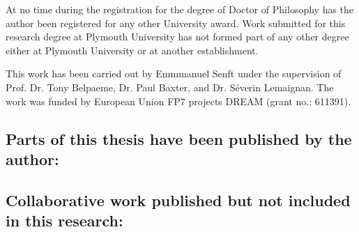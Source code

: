 At no time during the registration for the degree of Doctor of Philosophy has
the author been registered for any other University award. Work submitted for
this research degree at Plymouth University has not formed part of any other
degree either at Plymouth University or at another establishment.

This work has been carried out by Emmmanuel Senft under the supervision of Prof.
Dr. Tony Belpaeme, Dr. Paul Baxter, and Dr. S\'{e}verin Lemaignan. The work was
funded by European Union FP7 projects DREAM (grant no.: 611391).

\subsection*{Parts of this thesis have been published by the author:}











\subsection*{Collaborative work published but not included in this research:}













